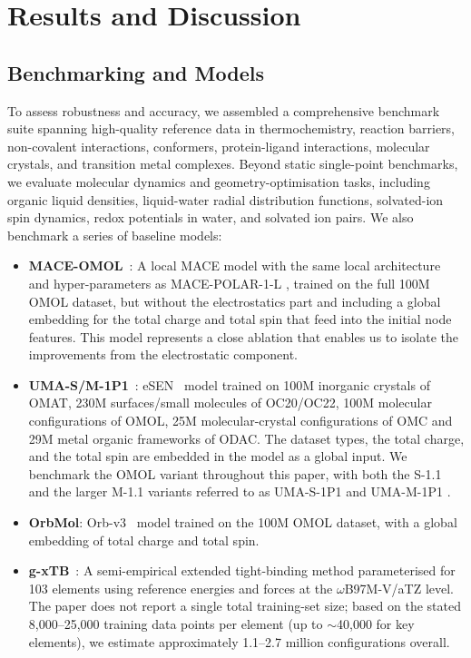 \documentclass[aps,%
superscriptaddress,
 amsmath,amssymb,
floatfix,
twocolumn
]{revtex4-2}
\newcommand{\MFPL}{MACE-POLAR-1-L }
\newcommand{\UMAS}{UMA-S-1P1 }
\newcommand{\UMAM}{UMA-M-1P1 }
\begin{document}
\section{Results and Discussion}
\subsection{Benchmarking and Models}

To assess robustness and accuracy, we assembled a comprehensive benchmark suite spanning high-quality reference data in thermochemistry, reaction barriers, non-covalent interactions, conformers, protein-ligand interactions, molecular
crystals, and transition metal complexes. Beyond static single-point benchmarks, we evaluate molecular dynamics and geometry-optimisation tasks, including organic liquid densities, liquid-water radial distribution functions, solvated-ion
spin dynamics, redox potentials in water, and solvated ion pairs.
We also benchmark a series of baseline models: 
\begin{itemize}
    \item \textbf{MACE-OMOL}~\cite{levine2025openmolecules2025omol25}: A local MACE model with the same local architecture and hyper-parameters as \MFPL, trained on the full 100M OMOL dataset, but without the electrostatics part and including a global embedding for the total charge and total spin that feed into the initial node features. This model represents a close ablation that enables us to isolate the improvements from the electrostatic component. 
    \item \textbf{UMA-S/M-1P1}~\cite{wood2025umafamilyuniversalmodels}: eSEN~\cite{fu2025learningsmoothexpressiveinteratomic} model trained on 100M inorganic crystals of OMAT, 230M surfaces/small molecules of OC20/OC22, 100M molecular configurations of OMOL, 25M molecular-crystal configurations of OMC and 29M metal organic frameworks of ODAC. The dataset types, the total charge, and the total spin are embedded in the model as a global input. We benchmark the OMOL variant throughout this paper, with both the S-1.1 and the larger M-1.1 variants referred to as \UMAS and \UMAM.
    \item \textbf{OrbMol}: Orb-v3~\cite{rhodes2025orbv3atomisticsimulationscale} model trained on the 100M OMOL dataset, with a global embedding of total charge and total spin.
    \item \textbf{g-xTB}~\cite{gxtb2025}: A semi-empirical extended tight-binding method parameterised for 103 elements using reference energies and forces at the $\omega$B97M-V/aTZ level. The paper does not report a single total training-set
    size; based on the stated 8,000–25,000 training data points per element (up to $\sim$40,000 for key elements), we estimate approximately 1.1–2.7 million configurations overall.
\end{itemize}
\end{document}
